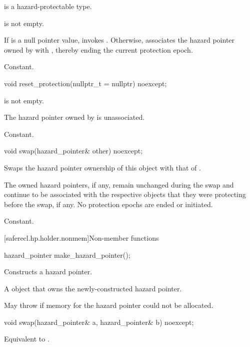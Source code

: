 \begin{itemdescr}
\pnum
\mandates
{} is a hazard-protectable type.

\pnum
\expects
{} is not empty.

\pnum
\effects
If  is a null pointer value, invokes .
Otherwise,
associates the hazard pointer owned by  with ,
thereby ending the current protection epoch.

\pnum
\complexity
Constant.
\end{itemdescr}

%
\begin{itemdecl}
void reset_protection(nullptr_t = nullptr) noexcept;
\end{itemdecl}

\begin{itemdescr}
\pnum
\expects
{} is not empty.

\pnum
\ensures
The hazard pointer owned by  is unassociated.

\pnum
\complexity
Constant.
\end{itemdescr}

%
\begin{itemdecl}
void swap(hazard_pointer& other) noexcept;
\end{itemdecl}

\begin{itemdescr}
\pnum
\effects
Swaps the hazard pointer ownership of this object with that of .
\begin{note}
The owned hazard pointers, if any, remain unchanged during the swap and
continue to be associated with the respective objects
that they were protecting before the swap, if any.
No protection epochs are ended or initiated.
\end{note}

\pnum
\complexity
Constant.
\end{itemdescr}

[saferecl.hp.holder.nonmem]{Non-member functions}

%
\begin{itemdecl}
hazard_pointer make_hazard_pointer();
\end{itemdecl}

\begin{itemdescr}
\pnum
\effects
Constructs a hazard pointer.

\pnum
\returns
A  object that owns the newly-constructed hazard pointer.

\pnum
\throws
May throw 
if memory for the hazard pointer could not be allocated.
\end{itemdescr}

%
\begin{itemdecl}
void swap(hazard_pointer& a, hazard_pointer& b) noexcept;
\end{itemdecl}

\begin{itemdescr}
\pnum
\effects
Equivalent to .
\end{itemdescr}
